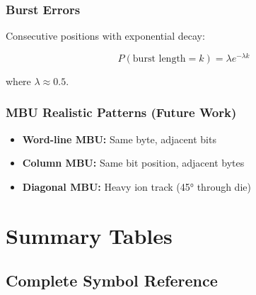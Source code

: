 \documentclass[11pt,a4paper]{article}
\begin{document}
\subsubsection{Burst Errors}

Consecutive positions with exponential decay:

\begin{equation}
P(\text{burst length} = k) = \lambda e^{-\lambda k}
\end{equation}

where $\lambda \approx 0.5$.

\subsubsection{MBU Realistic Patterns (Future Work)}

\begin{itemize}
    \item \textbf{Word-line MBU:} Same byte, adjacent bits
    \item \textbf{Column MBU:} Same bit position, adjacent bytes
    \item \textbf{Diagonal MBU:} Heavy ion track (45° through die)
\end{itemize}

\newpage
\section{Summary Tables}

\subsection{Complete Symbol Reference}
\end{document}
